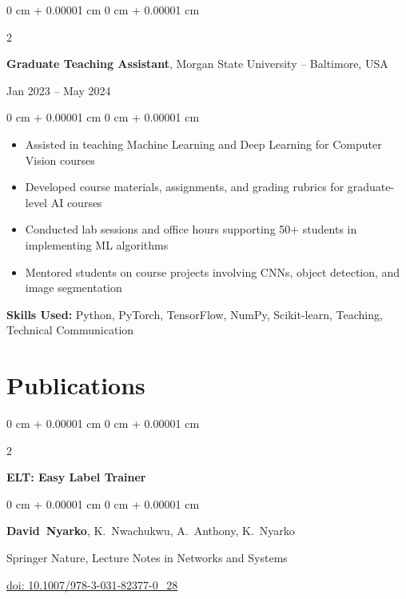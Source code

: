 \documentclass[10pt, letterpaper]{article}
\newenvironment{highlights}{
    \begin{itemize}[
        topsep=0.10 cm,
        parsep=0.10 cm,
        partopsep=0pt,
        itemsep=0pt,
        leftmargin=0 cm + 10pt
    ]
}{
    \end{itemize}
} %
\newenvironment{onecolentry}{
    \begin{adjustwidth}{
        0 cm + 0.00001 cm
    }{
        0 cm + 0.00001 cm
    }
}{
    \end{adjustwidth}
} %
\newenvironment{twocolentry}[2][]{
    \onecolentry
    \def\secondColumn{#2}
    \setcolumnwidth{\fill, 4.5 cm}
    \begin{paracol}{2}
}{
    \switchcolumn \raggedleft \secondColumn
    \end{paracol}
    \endonecolentry
} %
\begin{document}
    \vspace{0.25 cm}

    \begin{twocolentry}{
        Jan 2023 – May 2024
    }
        \textbf{Graduate Teaching Assistant}, Morgan State University -- Baltimore, USA
    \end{twocolentry}

    \vspace{0.10 cm}
    \begin{onecolentry}
        \begin{highlights}
            \item Assisted in teaching Machine Learning and Deep Learning for Computer Vision courses
            \item Developed course materials, assignments, and grading rubrics for graduate-level AI courses
            \item Conducted lab sessions and office hours supporting 50+ students in implementing ML algorithms
            \item Mentored students on course projects involving CNNs, object detection, and image segmentation
        \end{highlights}
        \vspace{0.05 cm}
        \textbf{Skills Used:} Python, PyTorch, TensorFlow, NumPy, Scikit-learn, Teaching, Technical Communication
    \end{onecolentry}



    \section{Publications}

    \begin{samepage}
        \begin{twocolentry}{
            2024
        }
            \textbf{ELT: Easy Label Trainer}
        \end{twocolentry}

        \vspace{0.10 cm}

        \begin{onecolentry}
            \mbox{\textbf{David Nyarko}}, \mbox{K. Nwachukwu}, \mbox{A. Anthony}, \mbox{K. Nyarko}

            \vspace{0.10 cm}

            Springer Nature, Lecture Notes in Networks and Systems

            \vspace{0.05 cm}

            \href{https://link.springer.com/chapter/10.1007/978-3-031-82377-0_28}{doi: 10.1007/978-3-031-82377-0\_28}
        \end{onecolentry}
    \end{samepage}
\end{document}
